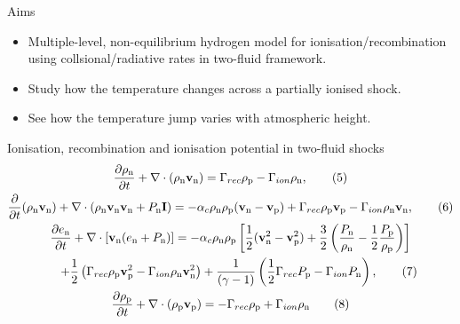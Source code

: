 \documentclass[10pt,aspectratio=169,usenames,dvipsnames]{beamer}
\begin{document}
\begin{frame}{Aims}
\begin{itemize}
    \item Multiple-level, non-equilibrium hydrogen model for ionisation/recombination using collsional/radiative rates in two-fluid framework.
    \item Study how the temperature changes across a partially ionised shock.
    \item See how the temperature jump varies with atmospheric height.
\end{itemize}
\end{frame}


\begin{frame}{Ionisation, recombination and ionisation potential in two-fluid shocks}
\footnotesize
\begin{gather}
\frac{\partial \rho _{\text{n}}}{\partial t} + \nabla \cdot (\rho _{\text{n}} \textbf{v}_{\text{n}})= \Gamma _{rec} \rho _{\rm p} - \Gamma _{ion} \rho _{\rm n}, \label{eqn:neutral1}\tag{5} \\
\frac{\partial}{\partial t}(\rho _{\text{n}} \textbf{v}_{\text{n}}) + \nabla \cdot (\rho _{\text{n}} \textbf{v}_{\text{n}} \textbf{v}_{\text{n}} + P_{\text{n}} \textbf{I}) = -\alpha _c \rho_{\text{n}} \rho_{\text{p}} (\textbf{v}_{\text{n}}-\textbf{v}_{\text{p}}) + \Gamma _{rec} \rho _{\rm p} \textbf{v}_{\rm p} - \Gamma _{ion} \rho_{\rm n} \textbf{v}_{\rm n}, \tag{6}\\
\frac{\partial e_{\text{n}}}{\partial t} + \nabla \cdot \left[\textbf{v}_{\text{n}} (e_{\text{n}} +P_{\text{n}}) \right] = -\alpha _c \rho _{\text{n}} \rho _{\text{p}} \left[ \frac{1}{2} (\textbf{v}_{\text{n}} ^2 - \textbf{v}_{\text{p}} ^2)+ \frac{3}{2} \left(\frac{P_{\rm n}}{\rho_{\rm n}}-\frac{1}{2}\frac{P_{\rm p}}{\rho_{\rm p}}\right) \right] \nonumber \\ \hspace{0.5cm}+ \frac{1}{2} \left( \Gamma _{rec} \rho _{\rm p} \textbf{v}_{\rm p} ^2 - \Gamma _{ion} \rho _{\rm n} \textbf{v}_{\rm n} ^2 \right) +\frac{1}{ (\gamma-1)} \left( \frac{1}{2} \Gamma _{rec} P_{\rm p} -\Gamma _{ion} P_{\rm n} \right), \tag{7}\\
\frac{\partial \rho _{\text{p}}}{\partial t} + \nabla \cdot (\rho_{\text{p}} \textbf{v}_{\text{p}}) = - \Gamma _{rec} \rho _{\rm p} + \Gamma _{ion} \rho _{\rm n} \label{eqn:plasma1}\tag{8}\\

\end{gather}
\end{frame}
\end{document}
